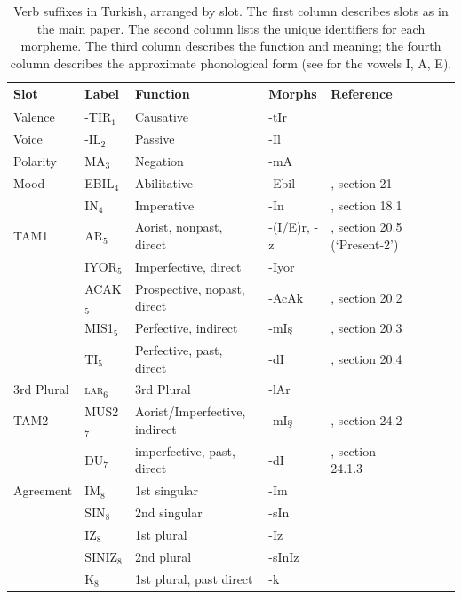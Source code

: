 \documentclass[11pt,letterpaper]{article}
\begin{document}
\begin{table}
\begin{tabular}{llllllll}
Slot & Label & Function & Morphs & Reference \\ \hline
\hline
	Valence & -TIR$_1$  & Causative & -tIr & \\
\hline
	Voice &  -IL$_2$ & Passive & -Il\\
\hline
Polarity  & MA$_3$ & Negation & -mA \\
\hline
Mood  & EBIL$_4$ & Abilitative & -Ebil & \cite{schaaik2020turkish}, section 21 \\
      & IN$_4$   & Imperative & -In & \cite{schaaik2020turkish}, section 18.1 \\
\hline
TAM1      & AR$_5$ & Aorist, nonpast, direct & -(I/E)r, -z  & \cite{schaaik2020turkish}, section 20.5 (`Present-2') \\
          & IYOR$_5$ & Imperfective, direct & -Iyor \\
          & ACAK$_5$ & Prospective, nopast, direct & -AcAk & \cite{schaaik2020turkish}, section 20.2\\
          & MIS1$_5$  & Perfective, indirect & -mIş & \cite{schaaik2020turkish}, section 20.3\\
          & TI$_5$ & Perfective, past, direct & -dI & \cite{schaaik2020turkish}, section 20.4\\
\hline
	3rd Plural& \textsc{lar}$_{6}$  & 3rd Plural & -lAr & \\
\hline
TAM2      & MUS2$_7$ & Aorist/Imperfective, indirect & -mIş & \cite{schaaik2020turkish}, section 24.2 \\
          & DU$_7$ & imperfective, past, direct & -dI & \cite{schaaik2020turkish}, section 24.1.3 \\
\hline
	Agreement & IM$_8$ & 1st singular & -Im\\
	  & SIN$_8$ &2nd singular & -sIn\\
	  & IZ$_8$  & 1st plural & -Iz\\
	  & SINIZ$_8$ & 2nd plural & -sInIz \\
	  & K$_8$     & 1st plural, past direct & -k\\
\hline
\end{tabular}
	\caption{Verb suffixes in Turkish, arranged by slot. The first column describes slots as in the main paper. The second column lists the unique identifiers for each morpheme. The third column describes the function and meaning; the fourth column describes the approximate phonological form (see \citet[Section 5.1]{schaaik2020turkish} for the vowels I, A, E).}\label{tab:turkish-suffixes}
\end{table}
\end{document}
